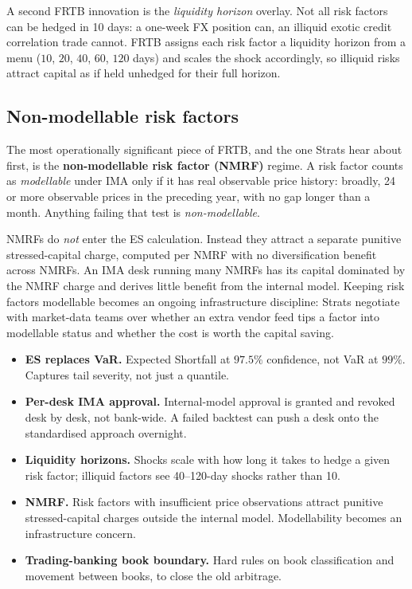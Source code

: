 A second FRTB innovation is the \emph{liquidity horizon} overlay.
Not all risk factors can be hedged in 10 days: a one-week FX
position can, an illiquid exotic credit correlation trade cannot.
FRTB assigns each risk factor a liquidity horizon from a menu
($10$, $20$, $40$, $60$, $120$ days) and scales the shock
accordingly, so illiquid risks attract capital as if held
unhedged for their full horizon.

\subsection{Non-modellable risk factors}

The most operationally significant piece of FRTB, and the one
Strats hear about first, is the \textbf{non-modellable risk
factor (NMRF)} regime.  A risk factor counts as \emph{modellable}
under IMA only if it has real observable price history: broadly,
24 or more observable prices in the preceding year, with no gap
longer than a month.  Anything failing that test is
\emph{non-modellable}.

NMRFs do \emph{not} enter the ES calculation.  Instead they
attract a separate punitive stressed-capital charge, computed per
NMRF with no diversification benefit across NMRFs.  An IMA desk
running many NMRFs has its capital dominated by the NMRF charge
and derives little benefit from the internal model.  Keeping risk
factors modellable becomes an ongoing infrastructure discipline:
Strats negotiate with market-data teams over whether an extra
vendor feed tips a factor into modellable status and whether the
cost is worth the capital saving.

\begin{keyfactbox}
\begin{itemize}
  \item \textbf{ES replaces VaR.}  Expected Shortfall at
    $97.5\%$ confidence, not VaR at $99\%$.  Captures tail
    severity, not just a quantile.
  \item \textbf{Per-desk IMA approval.}  Internal-model
    approval is granted and revoked desk by desk, not
    bank-wide.  A failed backtest can push a desk onto the
    standardised approach overnight.
  \item \textbf{Liquidity horizons.}  Shocks scale with how
    long it takes to hedge a given risk factor; illiquid
    factors see 40--120-day shocks rather than 10.
  \item \textbf{NMRF.}  Risk factors with insufficient price
    observations attract punitive stressed-capital charges
    outside the internal model.  Modellability becomes an
    infrastructure concern.
  \item \textbf{Trading-banking book boundary.}  Hard rules
    on book classification and movement between books, to
    close the old arbitrage.
\end{itemize}
\end{keyfactbox}

